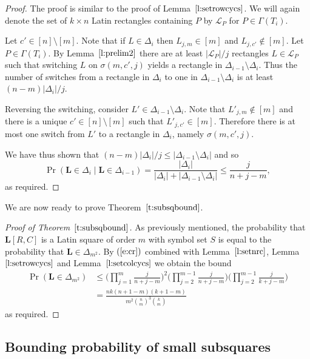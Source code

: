\documentclass[12pt]{article}
\theoremstyle{definition}
\numberwithin{equation}{section}
\def\eref#1{$(\ref{#1})$}
\def\lref#1{Lemma~$\ref{#1}$}
\def\tref#1{Theorem~$\ref{#1}$}
\renewcommand{\leq}{\leqslant}
\renewcommand{\L}{\mathbf{L}}
\begin{document}
	\begin{proof}
		The proof is similar to the proof of \lref{l:setrowcycs}. We will again denote the set of $k \times n$ Latin rectangles containing $P$ by $\mathcal{L}_P$ for $P \in \Gamma(T_i)$. 
		
		Let $c' \in [n] \setminus [m]$. Note that if $L \in \Delta_i$ then $L_{j, m} \in [m]$ and $L_{j, c'} \notin [m]$. Let $P \in \Gamma(T_i)$. By \lref{l:prelim2} there are at least $|\mathcal{L}_P|/j$ rectangles $L \in \mathcal{L}_P$ such that switching $L$ on $\sigma(m, c', j)$ yields a rectangle in $\Delta_{i-1} \setminus \Delta_i$. Thus the number of switches from a rectangle in $\Delta_i$ to one in $\Delta_{i-1} \setminus \Delta_i$ is at least $(n-m)|\Delta_i|/j$.
		
		Reversing the switching, consider $L' \in \Delta_{i-1} \setminus \Delta_i$. Note that $L'_{j, m} \notin [m]$ and there is a unique $c' \in [n]\setminus [m]$ such that $L'_{j, c'} \in [m]$. Therefore there is at most one switch from $L'$ to a rectangle in $\Delta_i$, namely $\sigma(m, c', j)$.
		
		We have thus shown that $(n-m)|\Delta_i|/j \leq |\Delta_{i-1} \setminus \Delta_i|$ and so
		\[
		\Pr(\L \in \Delta_i \mid  \L \in \Delta_{i-1}) = \frac{|\Delta_i|}{|\Delta_i|+|\Delta_{i-1} \setminus \Delta_i|} \leq \frac j{n+j-m},
		\]
		as required.	
	\end{proof}
	
	We are now ready to prove \tref{t:subsqbound}.
	
	\begin{proof}[Proof of \tref{t:subsqbound}]
		As previously mentioned, the probability that $\L[R, C]$ is a Latin square of order $m$ with symbol set $S$ is equal to the probability that $\L \in \Delta_{m^2}$. By \eref{e:cr} combined with \lref{l:setnrc}, \lref{l:setrowcycs} and \lref{l:setcolcycs} we obtain the bound
		\[
		\begin{aligned}
			\Pr(\L \in \Delta_{m^2}) &\leq
			\Bigg(\prod_{j=1}^m\frac{j}{n+j-m}\Bigg)^2\Bigg(\prod_{j=2}^{m-1}\frac{j}{n+j-m}\Bigg)\Bigg(\prod_{j=2}^{m-1}\frac{j}{k+j-m}\Bigg) \\
			&=\frac{nk(n+1-m)(k+1-m)}{m^2\binom{n}{m}^3\binom{k}{m}}
		\end{aligned}
		\]
		as required.
	\end{proof}
	
	
	\subsection{Bounding probability of small subsquares}\label{ss:subsq4bound}
	
\end{document}
